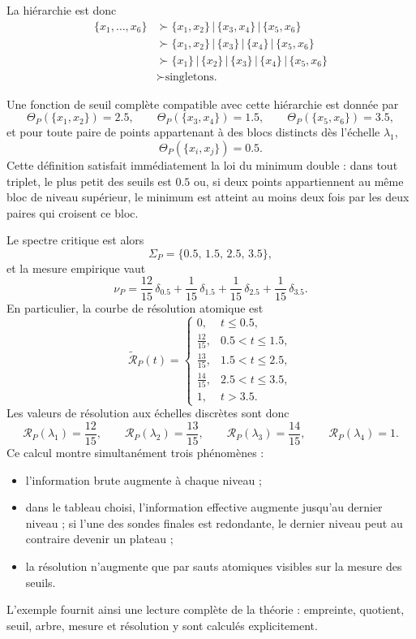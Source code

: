 \documentclass[11pt,a4paper,openany]{book}
\begin{document}
La hiérarchie est donc
\[
\begin{aligned}
\{x_1,\ldots,x_6\}
&\succ \{x_1,x_2\}\,|\,\{x_3,x_4\}\,|\,\{x_5,x_6\}\\
&\succ \{x_1,x_2\}\,|\,\{x_3\}\,|\,\{x_4\}\,|\,\{x_5,x_6\}\\
&\succ \{x_1\}\,|\,\{x_2\}\,|\,\{x_3\}\,|\,\{x_4\}\,|\,\{x_5,x_6\}\\
&\succ \text{singletons.}
\end{aligned}
\]

Une fonction de seuil complète compatible avec cette hiérarchie est donnée par
\[
\Theta_P(\{x_1,x_2\})=2.5,\qquad
\Theta_P(\{x_3,x_4\})=1.5,\qquad
\Theta_P(\{x_5,x_6\})=3.5,
\]
et pour toute paire de points appartenant à des blocs distincts dès l'échelle \(\lambda_1\),
\[
\Theta_P(\{x_i,x_j\})=0.5.
\]
Cette définition satisfait immédiatement la loi du minimum double : dans tout triplet, le plus petit des seuils est \(0.5\) ou, si deux points appartiennent au même bloc de niveau supérieur, le minimum est atteint au moins deux fois par les deux paires qui croisent ce bloc.

Le spectre critique est alors
\[
\Sigma_P=\{0.5,\,1.5,\,2.5,\,3.5\},
\]
et la mesure empirique vaut
\[
\nu_P
=
\frac{12}{15}\,\delta_{0.5}
+\frac{1}{15}\,\delta_{1.5}
+\frac{1}{15}\,\delta_{2.5}
+\frac{1}{15}\,\delta_{3.5}.
\]
En particulier, la courbe de résolution atomique est
\[
\widetilde{\mathcal R}_P(t)=
\begin{cases}
0, & t\le 0.5,\\[0.3em]
\frac{12}{15}, & 0.5<t\le 1.5,\\[0.3em]
\frac{13}{15}, & 1.5<t\le 2.5,\\[0.3em]
\frac{14}{15}, & 2.5<t\le 3.5,\\[0.3em]
1, & t>3.5.
\end{cases}
\]
Les valeurs de résolution aux échelles discrètes sont donc
\[
\mathcal R_P(\lambda_1)=\frac{12}{15},\qquad
\mathcal R_P(\lambda_2)=\frac{13}{15},\qquad
\mathcal R_P(\lambda_3)=\frac{14}{15},\qquad
\mathcal R_P(\lambda_4)=1.
\]
Ce calcul montre simultanément trois phénomènes :
\begin{itemize}[leftmargin=1.4em]
\item l'information brute augmente à chaque niveau ;
\item dans le tableau choisi, l'information effective augmente jusqu'au dernier niveau ; si l'une des sondes finales est redondante, le dernier niveau peut au contraire devenir un plateau ;
\item la résolution n'augmente que par sauts atomiques visibles sur la mesure des seuils.
\end{itemize}
L'exemple fournit ainsi une lecture complète de la théorie : empreinte, quotient, seuil, arbre, mesure et résolution y sont calculés explicitement.
\end{document}

